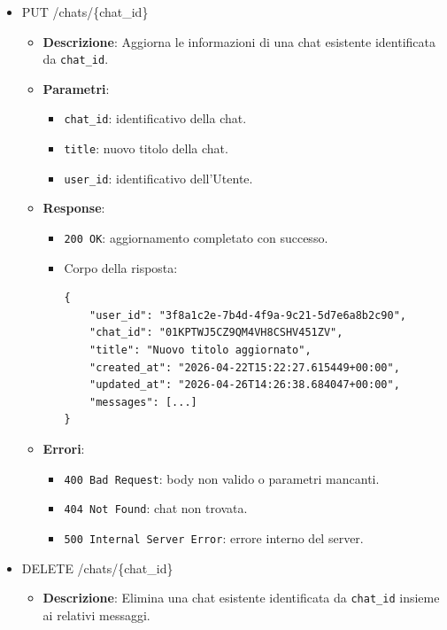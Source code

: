 \documentclass[a4paper,12pt]{article}
\newcommand{\code}[1]{{\ttfamily\textcolor{purple!85!black}{#1}}}
\begin{document}
\begin{itemize}
    \item \code{PUT /chats/\{chat\_id\}}
        \begin{itemize}
            \item \textbf{Descrizione}: Aggiorna le informazioni di una chat esistente identificata da \texttt{chat\_id}.
        
            \item \textbf{Parametri}:
            \begin{itemize}
                \item \texttt{chat\_id}: identificativo della chat.
                \item \texttt{title}: nuovo titolo della chat.
                \item \texttt{user\_id}: identificativo dell’Utente.
            \end{itemize}
        
            \item \textbf{Response}:
            \begin{itemize}
                \item \texttt{200 OK}: aggiornamento completato con successo.
                \item Corpo della risposta:
\begin{verbatim}
{
    "user_id": "3f8a1c2e-7b4d-4f9a-9c21-5d7e6a8b2c90",
    "chat_id": "01KPTWJ5CZ9QM4VH8CSHV451ZV",
    "title": "Nuovo titolo aggiornato",
    "created_at": "2026-04-22T15:22:27.615449+00:00",
    "updated_at": "2026-04-26T14:26:38.684047+00:00",
    "messages": [...]
}
\end{verbatim}
            \end{itemize}
        
            \item \textbf{Errori}:
            \begin{itemize}
                \item \texttt{400 Bad Request}: body non valido o parametri mancanti.
                \item \texttt{404 Not Found}: chat non trovata.
                \item \texttt{500 Internal Server Error}: errore interno del server.
            \end{itemize}
        \end{itemize}

    \item \code{DELETE /chats/\{chat\_id\}}
        \begin{itemize}
            \item \textbf{Descrizione}: Elimina una chat esistente identificata da \texttt{chat\_id} insieme ai relativi messaggi.
        

\end{itemize}
\end{itemize}
\end{document}
